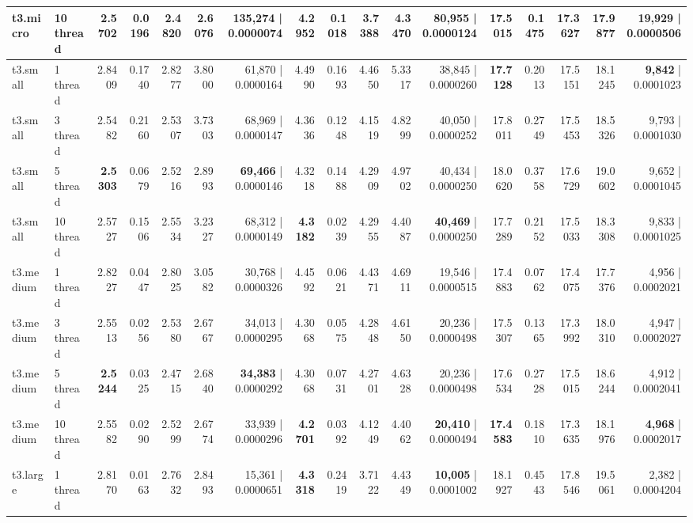 \documentclass[conference]{IEEEtran}
\begin{document}
\begin{table}[htbp]
{\begin{tabular}{ll|rrrrr|rrrrr|rrrrr}
				t3.micro & 10 thread & 2.5702 & 0.0196 & 2.4820 & 2.6076 & 135,274 | 0.0000074 & \textbf{4.2952} & 0.1018 & 3.7388 & 4.3470 & \textbf{80,955} | 0.0000124 & \textbf{17.5015} & 0.1475 & 17.3627 & 17.9877 & \textbf{19,929} | 0.0000506 \\
				\midrule
				t3.small & 1 thread & 2.8409 & 0.1740 & 2.8277 & 3.8000 & 61,870 | 0.0000164 & 4.4990 & 0.1693 & 4.4650 & 5.3317 & 38,845 | 0.0000260 & \textbf{17.7128} & 0.2013 & 17.5151 & 18.1245 & \textbf{9,842} | 0.0001023 \\
				t3.small & 3 thread & 2.5482 & 0.2160 & 2.5307 & 3.7303 & 68,969 | 0.0000147 & 4.3636 & 0.1248 & 4.1519 & 4.8299 & 40,050 | 0.0000252 & 17.8011 & 0.2749 & 17.5453 & 18.5326 & 9,793 | 0.0001030 \\
				t3.small & 5 thread & \textbf{2.5303} & 0.0679 & 2.5216 & 2.8993 & \textbf{69,466} | 0.0000146 & 4.3218 & 0.1488 & 4.2909 & 4.9702 & 40,434 | 0.0000250 & 18.0620 & 0.3758 & 17.6729 & 19.0602 & 9,652 | 0.0001045 \\
				t3.small & 10 thread & 2.5727 & 0.1506 & 2.5534 & 3.2327 & 68,312 | 0.0000149 & \textbf{4.3182} & 0.0239 & 4.2955 & 4.4087 & \textbf{40,469} | 0.0000250 & 17.7289 & 0.2152 & 17.5033 & 18.3308 & 9,833 | 0.0001025 \\
				\midrule
				t3.medium & 1 thread & 2.8227 & 0.0447 & 2.8025 & 3.0582 & 30,768 | 0.0000326 & 4.4592 & 0.0621 & 4.4371 & 4.6911 & 19,546 | 0.0000515 & 17.4883 & 0.0762 & 17.4075 & 17.7376 & 4,956 | 0.0002021 \\
				t3.medium & 3 thread & 2.5513 & 0.0256 & 2.5380 & 2.6767 & 34,013 | 0.0000295 & 4.3068 & 0.0575 & 4.2848 & 4.6150 & 20,236 | 0.0000498 & 17.5307 & 0.1365 & 17.3992 & 18.0310 & 4,947 | 0.0002027 \\
				t3.medium & 5 thread & \textbf{2.5244} & 0.0325 & 2.4715 & 2.6840 & \textbf{34,383} | 0.0000292 & 4.3068 & 0.0731 & 4.2701 & 4.6328 & 20,236 | 0.0000498 & 17.6534 & 0.2728 & 17.5015 & 18.6244 & 4,912 | 0.0002041 \\
				t3.medium & 10 thread & 2.5582 & 0.0290 & 2.5299 & 2.6774 & 33,939 | 0.0000296 & \textbf{4.2701} & 0.0392 & 4.1249 & 4.4062 & \textbf{20,410} | 0.0000494 & \textbf{17.4583} & 0.1810 & 17.3635 & 18.1976 & \textbf{4,968} | 0.0002017 \\
				\midrule
				t3.large & 1 thread & 2.8170 & 0.0163 & 2.7632 & 2.8493 & 15,361 | 0.0000651 & \textbf{4.3318} & 0.2419 & 3.7122 & 4.4349 & \textbf{10,005} | 0.0001002 & 18.1927 & 0.4543 & 17.8546 & 19.5061 & 2,382 | 0.0004204 \\

\end{tabular}}
\end{table}
\end{document}
